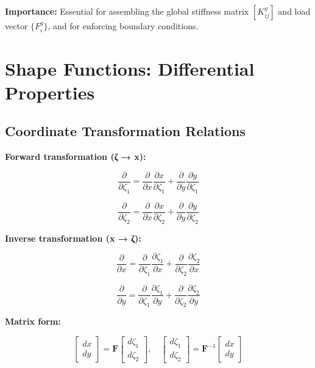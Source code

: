 \documentclass[
  11pt,
  a4paper,
]{scrbook}
\begin{document}
\textbf{Importance:} Essential for assembling the global stiffness
matrix \([K_{ij}^g]\) and load vector \(\{F_i^g\}\), and for enforcing
boundary conditions.

\section{Shape Functions: Differential
Properties}\label{shape-functions-differential-properties}

\subsection{Coordinate Transformation
Relations}\label{coordinate-transformation-relations}

\textbf{Forward transformation (ζ → x):}

\[\frac{\partial}{\partial \zeta_1} = \frac{\partial}{\partial x}\frac{\partial x}{\partial \zeta_1} + \frac{\partial}{\partial y}\frac{\partial y}{\partial \zeta_1}\]

\[\frac{\partial}{\partial \zeta_2} = \frac{\partial}{\partial x}\frac{\partial x}{\partial \zeta_2} + \frac{\partial}{\partial y}\frac{\partial y}{\partial \zeta_2}\]

\textbf{Inverse transformation (x → ζ):}

\[\frac{\partial}{\partial x} = \frac{\partial}{\partial \zeta_1}\frac{\partial \zeta_1}{\partial x} + \frac{\partial}{\partial \zeta_2}\frac{\partial \zeta_2}{\partial x}\]

\[\frac{\partial}{\partial y} = \frac{\partial}{\partial \zeta_1}\frac{\partial \zeta_1}{\partial y} + \frac{\partial}{\partial \zeta_2}\frac{\partial \zeta_2}{\partial y}\]

\textbf{Matrix form:}

\[\begin{bmatrix} dx \\ dy \end{bmatrix} = \mathbf{F} \begin{bmatrix} d\zeta_1 \\ d\zeta_2 \end{bmatrix}, \quad \begin{bmatrix} d\zeta_1 \\ d\zeta_2 \end{bmatrix} = \mathbf{F}^{-1} \begin{bmatrix} dx \\ dy \end{bmatrix}\]
\end{document}
